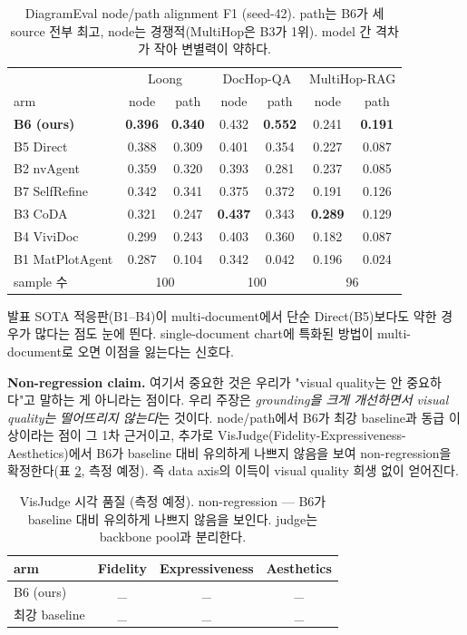\documentclass[11pt]{article}
\begin{document}
\begin{table}[h]
\centering
\small
\begin{tabular}{l cc cc cc}
\toprule
& \multicolumn{2}{c}{Loong} & \multicolumn{2}{c}{DocHop-QA} & \multicolumn{2}{c}{MultiHop-RAG} \\
arm & node & path & node & path & node & path \\
\midrule
\textbf{B6 (ours)} & \textbf{0.396} & \textbf{0.340} & 0.432 & \textbf{0.552} & 0.241 & \textbf{0.191} \\
B5 Direct      & 0.388 & 0.309 & 0.401 & 0.354 & 0.227 & 0.087 \\
B2 nvAgent     & 0.359 & 0.320 & 0.393 & 0.281 & 0.237 & 0.085 \\
B7 SelfRefine  & 0.342 & 0.341 & 0.375 & 0.372 & 0.191 & 0.126 \\
B3 CoDA        & 0.321 & 0.247 & \textbf{0.437} & 0.343 & \textbf{0.289} & 0.129 \\
B4 ViviDoc     & 0.299 & 0.243 & 0.403 & 0.360 & 0.182 & 0.087 \\
B1 MatPlotAgent& 0.287 & 0.104 & 0.342 & 0.042 & 0.196 & 0.024 \\
\midrule
sample 수 & \multicolumn{2}{c}{100} & \multicolumn{2}{c}{100} & \multicolumn{2}{c}{96} \\
\bottomrule
\end{tabular}
\caption{DiagramEval node/path alignment F1 (seed-42). path는 B6가 세 source 전부 최고,
node는 경쟁적(MultiHop은 B3가 1위). model 간 격차가 작아 변별력이 약하다.}
\label{tab:nodepath}
\end{table}

발표 SOTA 적응판(B1--B4)이 multi-document에서 단순 Direct(B5)보다도 약한 경우가 많다는 점도
눈에 띈다. single-document chart에 특화된 방법이 multi-document로 오면 이점을 잃는다는 신호다.

\textbf{Non-regression claim.} 여기서 중요한 것은 우리가 "visual quality는 안 중요하다"고
말하는 게 아니라는 점이다. 우리 주장은 \emph{grounding을 크게 개선하면서 visual quality는
떨어뜨리지 않는다}는 것이다. node/path에서 B6가 최강 baseline과 동급 이상이라는 점이 그 1차
근거이고, 추가로 VisJudge(Fidelity-Expressiveness-Aesthetics)에서 B6가 baseline 대비 유의하게
나쁘지 않음을 보여 non-regression을 확정한다(표 \ref{tab:visjudge}, 측정 예정). 즉 data axis의
이득이 visual quality 희생 없이 얻어진다.

\begin{table}[h]
\centering
\small
\begin{tabular}{lccc}
\toprule
arm & Fidelity & Expressiveness & Aesthetics \\
\midrule
B6 (ours) & \_ & \_ & \_ \\
최강 baseline & \_ & \_ & \_ \\
\bottomrule
\end{tabular}
\caption{VisJudge 시각 품질 (측정 예정). non-regression — B6가 baseline 대비 유의하게 나쁘지
않음을 보인다. judge는 backbone pool과 분리한다.}
\label{tab:visjudge}
\end{table}
\end{document}
